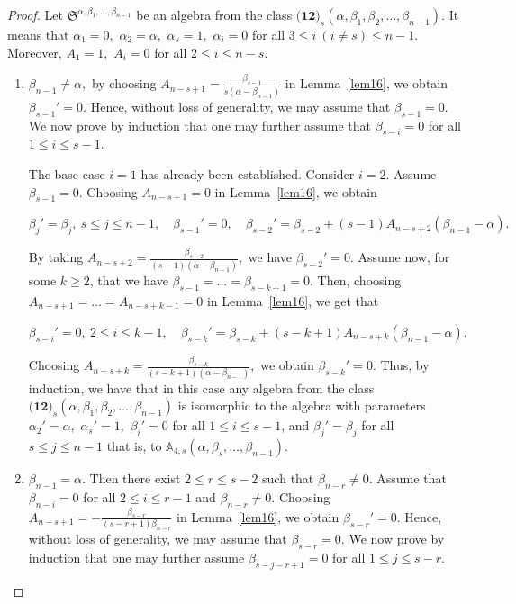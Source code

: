 \documentclass{jonasart}
\begin{document}
	\begin{proof}
		Let $\mathfrak{S}^{\alpha, \beta_{1},\dots, \beta_{n-1}}$ be an algebra from the class $\textbf{(12)}_s (\alpha, \beta_{1},\beta_{2},\dots,\beta_{n-1}).$ It means that
		$\alpha_1 =0,$ $\alpha_2 =\alpha,$ $\alpha_s =1,$ $\alpha_i =0$ for all $3 \leq i \ (i \neq s) \leq n-1.$
		Moreover, $A_1 =1,$ $A_i =0$ for all $2 \leq i \leq n-s.$
		\begin{enumerate}
			\item[\textbf{Case 1:}] $\beta_{n-1} \neq \alpha, $ by choosing $A_{n-s+1} = \frac{\beta_{s-1}}{s(\alpha -\beta_{n-1})}$ in Lemma~\ref{lem16}, we obtain $\beta_{s-1}'=0.$ Hence, without loss of generality, we may assume that $\beta_{s-1}=0.$ We now prove by induction that one may further assume that $\beta_{s-i} = 0$ for all $1 \le i \le s-1$.

			The base case $i=1$ has already been established. Consider $i=2$. Assume $\beta_{s-1}=0$. Choosing $A_{n-s+1} = 0$ in Lemma~\ref{lem16}, we obtain
			\begin{center}
				$\beta_{j}'=\beta_{j}, \ s \leq j \leq n-1, \quad \beta_{s-1}'=0, \quad \beta_{s-2}'=\beta_{s-2} +(s-1) A_{n-s+2} (\beta_{n-1}-\alpha).$
			\end{center}
			By taking $A_{n-s+2}=\frac{\beta_{s-2}}{(s-1)(\alpha-\beta_{n-1})},$ we have $\beta_{s-2}'=0.$
			Assume now, for some $k \ge 2$, that we have $\beta_{s-1}= \dots= \beta_{s-k+1}=0$. Then, choosing $A_{n-s+1} =\dots=A_{n-s+k-1}=0$
			in Lemma~\ref{lem16}, we get that
			\begin{center}
				$\beta_{s-i}'=0, \ 2 \leq i \leq k-1, \quad \beta_{s-k}'=\beta_{s-k} + (s-k+1) A_{n-s+k} (\beta_{n-1}-\alpha).$
			\end{center}
			Choosing $A_{n-s+k}=\frac{\beta_{s-k}}{(s-k+1)(\alpha - \beta_{n-1})},$ we obtain $\beta_{s-k}'=0.$
			Thus, by induction, we have that in this case any algebra from the class $\textbf{(12)}_s (\alpha, \beta_{1},\beta_{2},\dots,\beta_{n-1})$ is isomorphic to the algebra with parameters $\alpha_2 ' = \alpha,$ $\alpha_s '=1,$ $\beta_{i}' = 0$ for all $1 \le i \le s-1$, and $\beta_j '=\beta_j$ for all $s \leq j \leq n-1$ that is, to $\mathbb{A}_{4,s}(\alpha,\beta_s,\dots,\beta_{n-1}).$

			\item[\textbf{Case 2:}] $\beta_{n-1} = \alpha.$ Then there exist $2 \le r \le {s-2}$ such that $\beta_{n-r} \neq 0.$ Assume that
			$\beta_{n-i}=0$ for all $2\leq i\leq r-1$ and $\beta_{n-r} \neq 0.$ Choosing $A_{n-s+1} = -\frac{\beta_{s-r}}{(s-r+1)\beta_{n-r} }$ in Lemma~\ref{lem16}, we obtain $\beta_{s-r}'=0.$
			Hence, without loss of generality, we may assume that $\beta_{s-r}=0.$
			We now prove by induction that one may further assume $\beta_{s-j-r+1} = 0$ for all $1 \le j \le s-r$.


\end{enumerate}
\end{proof}
\end{document}
